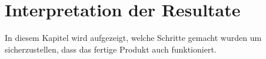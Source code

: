 \section{Interpretation der Resultate}\label{sec:validierung}
In diesem Kapitel wird aufgezeigt, welche Schritte gemacht wurden um sicherzustellen, dass das fertige Produkt auch funktioniert.